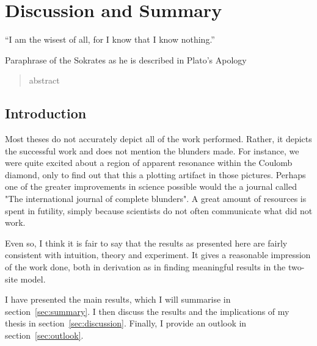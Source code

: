 \chapter{Discussion and Summary}
\label{ch:chapter_5}




\epigraph{
    “I am the wisest of all, for I know that I know nothing.”
}{Paraphrase of the Sokrates as he is described in Plato's Apology}

\begin{abstract}
abstract
\end{abstract}

\newpage
\section{Introduction}
Most theses do not accurately depict all of the work performed. Rather, it depicts the successful work and does not mention the blunders made. For instance, we were quite excited about a region of apparent resonance within the Coulomb diamond, only to find out that this a plotting artifact in those pictures. Perhaps one of the greater improvements in science possible would the a journal called "The international journal of complete blunders". A great amount of resources is spent in futility, simply because scientists do not often communicate what did not work.

Even so, I think it is fair to say that the results as presented here are fairly consistent with intuition, theory and experiment. It gives a reasonable impression of the work done, both in derivation as in finding meaningful results in the two-site model. 

I have presented the main results, which I will summarise in section~\ref{sec:summary}. I then discuss the results and the implications of my thesis in section~\ref{sec:discussion}. Finally, I provide an outlook in section~\ref{sec:outlook}.


